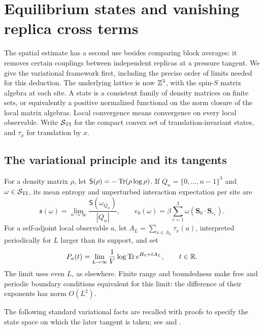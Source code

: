 \section{Equilibrium states and vanishing replica cross terms}
\label{sec:equilibrium}

The spatial estimate has a second use besides comparing block averages:
it removes certain couplings between independent replicas at a pressure
tangent.  We give the variational framework first, including the precise
order of limits needed for this deduction.  The underlying lattice is
now $\mathbb Z^3$, with the spin-$S$ matrix algebra at each site.  A state is a
consistent family of density matrices on finite sets, or equivalently
a positive normalized functional on the norm closure of the local
matrix algebras.  Local convergence means convergence on every local
observable.  Write $\mathcal S_{\rm TI}$ for the compact convex set of
translation-invariant states, and $\tau_x$ for translation by $x$.

\subsection{The variational principle and its tangents}

For a density matrix $\rho$, let
$\mathsf S(\rho)=-\operatorname{Tr}(\rho\log\rho)$.  If $Q_n=\{0,\ldots,n-1\}^3$
and $\omega\in\mathcal S_{\rm TI}$, its mean entropy and unperturbed
interaction expectation per site are
\[
 \mathfrak s(\omega)=\lim_{n\to\infty}\frac{\mathsf S(\omega_{Q_n})}{|Q_n|},
 \qquad
 e_0(\omega)=\beta\sum_{r=1}^3
                     \omega(\mathbf S_0\cdot\mathbf S_{e_r}).
\]
For a self-adjoint local observable $a$, let
$A_L=\sum_{x\in\Lambda_L}\tau_x(a)$, interpreted periodically for $L$
larger than its support, and set
\[
 P_a(t)=\lim_{L\to\infty}\frac1V
                   \log\operatorname{Tr} e^{H_0+tA_L},\qquad t\in\mathbb R.
\]
The limit uses even $L$, as elsewhere.  Finite range and boundedness
make free and periodic boundary conditions equivalent for this limit:
the difference of their exponents has norm $O(L^2)$.

The following standard variational facts are recalled with proofs to
specify the state space on which the later tangent is taken; see
\cite[Theorems~2--3]{LanfordRobinson1968Entropy} and
\cite[Theorem~3]{LanfordRobinson1968Spin}.

